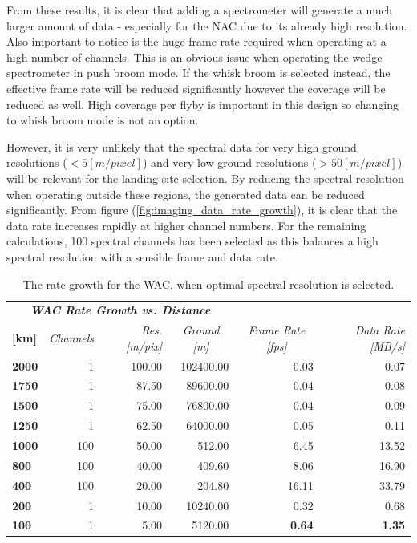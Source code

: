From these results, it is clear that adding a spectrometer will generate a much larger amount of data - especially for the NAC due to its already high resolution. Also important to notice is the huge frame rate required when operating at a high number of channels. This is an obvious issue when operating the wedge spectrometer in push broom mode. If the whisk broom is selected instead, the effective frame rate will be reduced significantly however the coverage will be reduced as well. High coverage per flyby is important in this design so changing to whisk broom mode is not an option.

However, it is very unlikely that the spectral data for very high ground resolutions ($<5[m/pixel]$) and very low ground resolutions ($>50[m/pixel]$) will be relevant for the landing site selection. By reducing the spectral resolution when operating outside these regions, the generated data can be reduced significantly. From figure (\ref{fig:imaging_data_rate_growth}), it is clear that the data rate increases rapidly at higher channel numbers. For the remaining calculations, 100 spectral channels has been selected as this balances a high spectral resolution with a sensible frame and data rate.
\begin{table}[htb]
  \centering
    \begin{tabular}{l|r|r|r|r|r|}
\multicolumn{4}{c|}{\textit{\textbf{WAC Rate Growth vs. Distance}}} & \multicolumn{1}{r}{} & \multicolumn{1}{r}{} \bigstrut[b]\\
\cline{1-4}\textbf{[km]} & \textit{Channels} & \textit{Res. [m/pix]} & \multicolumn{1}{c|}{\textit{Ground [m]}} & \multicolumn{1}{c}{\textit{Frame Rate [fps]}} & \multicolumn{1}{r}{\textit{Data Rate [MB/s]}} \bigstrut\\
\hline
\textbf{2000} & 1     & 100.00 & 102400.00 & 0.03  & 0.07 \bigstrut[t]\\
\textbf{1750} & 1     & 87.50 & 89600.00 & 0.04  & 0.08 \\
\textbf{1500} & 1     & 75.00 & 76800.00 & 0.04  & 0.09 \\
\textbf{1250} & 1     & 62.50 & 64000.00 & 0.05  & 0.11 \\
\textbf{1000} & 100   & 50.00 & 512.00 & 6.45  & 13.52 \\
\textbf{800} & 100   & 40.00 & 409.60 & 8.06  & 16.90 \\
\textbf{400} & 100   & 20.00 & 204.80 & 16.11 & 33.79 \\
\textbf{200} & 1     & 10.00 & 10240.00 & 0.32  & 0.68 \\
\textbf{100} & 1     & 5.00  & 5120.00 & \textbf{0.64} & \textbf{1.35} \\
\end{tabular}%
  \caption{The rate growth for the WAC, when optimal spectral resolution is selected.}
  \label{tab:opt_rate_growth_wac}%
\end{table}%

